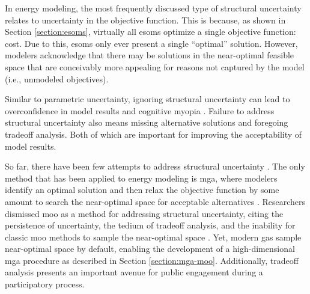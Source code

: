 In energy modeling, the most frequently discussed type of structural uncertainty
relates to uncertainty in the objective function. This is because, as shown in
Section \ref{section:esoms}, virtually all \acp{esom} optimize a single
objective function: cost. Due to this, \acp{esom} only ever present a single
``optimal'' solution. However, modelers acknowledge that there may be solutions
in the near-optimal feasible space that are conceivably more appealing for
reasons not captured by the model (i.e., unmodeled objectives). 

Similar to parametric uncertainty, ignoring structural uncertainty can lead to
overconfidence in model results and cognitive myopia
\cite{decarolis_using_2011,decarolis_modelling_2016}. Failure to address
structural uncertainty also means missing alternative solutions and foregoing
tradeoff analysis. Both of which are important for improving the acceptability
of model results.

So far, there have been few attempts to address structural uncertainty
\cite{yue_review_2018}. The only method that has been applied to energy modeling
is \acf{mga}, where modelers identify an optimal solution and then relax the
objective function by some amount to search the near-optimal space for
acceptable alternatives
\cite{decarolis_modelling_2016,neumann_near-optimal_2021,price_modelling_2017,yue_review_2018}.
Researchers dismissed \acf{moo} as a method for addressing structural
uncertainty, citing the persistence of uncertainty, the tedium of tradeoff
analysis, and the inability for classic \ac{moo} methods to sample the
near-optimal space \cite{decarolis_using_2011}. Yet, modern \acfp{ga} sample
near-optimal space by default, enabling the development of a high-dimensional
\ac{mga} procedure as described in Section \ref{section:mga-moo}. Additionally,
tradeoff analysis presents an important avenue for public engagement during a
participatory process.

